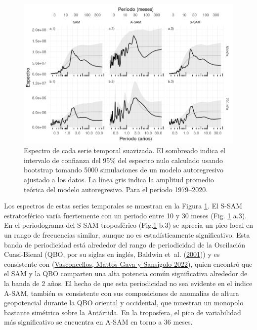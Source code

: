 \documentclass[12pt,oneside,a4paper]{reedthesis}
\begin{document}
\begin{figure}

{\centering \includegraphics{figures/30-sam/spectrum-1} 

}

\caption{Espectro de cada serie temporal suavizada. El sombreado indica el intervalo de confianza del 95\% del espectro nulo calculado usando bootstrap tomando 5000 simulaciones de un modelo autoregresivo ajustado a los datos. La línea gris indica la amplitud promedio teórica del modelo autoregresivo. Para el período 1979--2020.}\label{fig:spectrum}
\end{figure}

Los espectros de estas series temporales se muestran en la Figura \ref{fig:spectrum}.
El S-SAM estratosférico varía fuertemente con un periodo entre 10 y 30 meses (Fig. \ref{fig:spectrum} a.3).
En el periodograma del S-SAM troposférico (Fig.\ref{fig:spectrum} b.3) se aprecia un pico local en un rango de frecuencias similar, aunque no es estadísticamente significativo.
Esta banda de periodicidad está alrededor del rango de periodicidad de la Oscilación Cuasi-Bienal (QBO, por su siglas en inglés, Baldwin et~al. (\protect\hyperlink{ref-baldwin2001b}{2001})) y es consistente con (\protect\hyperlink{ref-vasconcellos2022}{Vasconcellos, Mattos-Gava y Sansigolo 2022}), quien encontró que el SAM y la QBO comparten una alta potencia común significativa alrededor de la banda de 2 años.
El hecho de que esta periodicidad no sea evidente en el índice A-SAM, también es consistente con sus composiciones de anomalías de altura geopotencial durante la QBO oriental y occidental, que muestran un monopolo bastante simétrico sobre la Antártida.
En la troposfera, el pico de variabilidad más significativo se encuentra en A-SAM en torno a 36 meses.
\end{document}
